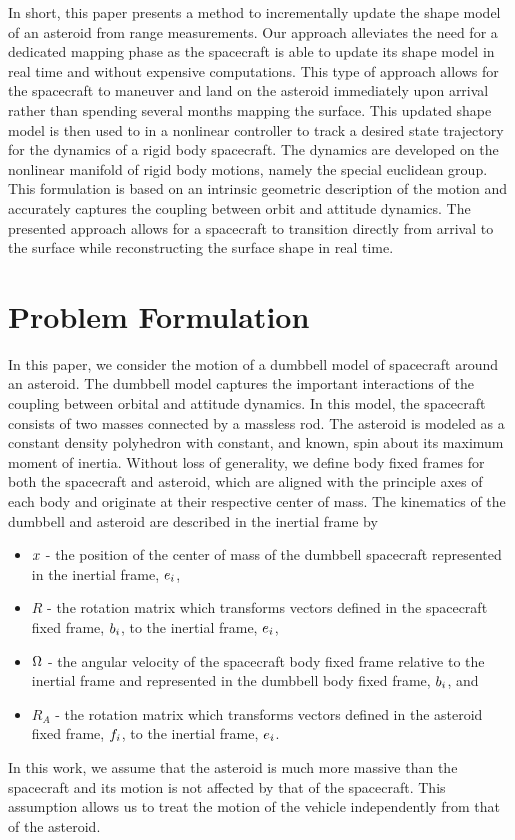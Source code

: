 \documentclass[letterpaper, paper,11pt]{AAS}		%
\begin{document}
In short, this paper presents a method to incrementally update the shape  model of an asteroid from range measurements. 
Our approach alleviates the need for a dedicated mapping phase as the spacecraft is able to update its shape model in real time and without expensive computations.
This type of approach allows for the spacecraft to maneuver and land on the asteroid immediately upon arrival rather than spending several months mapping the surface.
This updated shape model is then used to in a nonlinear controller to track a desired state trajectory for the dynamics of a rigid body spacecraft.
The dynamics are developed on the nonlinear manifold of rigid body motions, namely the special euclidean group.
This formulation is based on an intrinsic geometric description of the motion and accurately captures the coupling between orbit and attitude dynamics. 
The presented approach allows for a spacecraft to transition directly from arrival to the surface while reconstructing the surface shape in real time.


\section{Problem Formulation}\label{sec:problem}

In this paper, we consider the motion of a dumbbell model of spacecraft around an asteroid.
The dumbbell model captures the important interactions of the coupling between orbital and attitude dynamics.
In this model, the spacecraft consists of two masses connected by a massless rod.
The asteroid is modeled as a constant density polyhedron with constant, and known, spin about its maximum moment of inertia. 
Without loss of generality, we define body fixed frames for both the spacecraft and asteroid, which are aligned with the principle axes of each body and originate at their respective center of mass. 
The kinematics of the dumbbell and asteroid are described in the inertial frame by
\begin{itemize}
    \item \( x \) - the position of the center of mass of the dumbbell spacecraft represented in the inertial frame, \( e_i\),
    \item \( R \) - the rotation matrix which transforms vectors defined in the spacecraft fixed frame, \( b_i \), to the inertial frame, \( e_i \),
    \item \( \Omega \) - the angular velocity of the spacecraft body fixed frame relative to the inertial frame and represented in the dumbbell body fixed frame, \( b_i \), and
    \item \( R_A \) - the rotation matrix which transforms vectors defined in the asteroid fixed frame, \( f_i \), to the inertial frame, \( e_i \).
\end{itemize}
In this work, we assume that the asteroid is much more massive than the spacecraft and its motion is not affected by that of the spacecraft.
This assumption allows us to treat the motion of the vehicle independently from that of the asteroid. 
\end{document}
